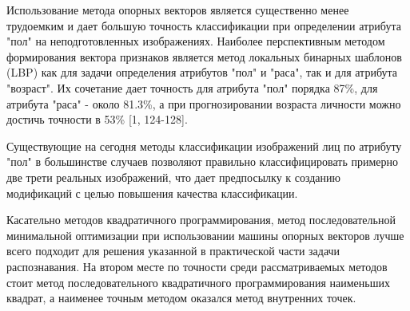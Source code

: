 \documentclass[main.tex]{subfiles}
\begin{document}
Использование метода опорных векторов является существенно менее трудоемким и дает большую точность классификации при определении атрибута "пол" на неподготовленных изображениях. Наиболее перспективным методом формирования вектора признаков является метод локальных бинарных шаблонов (LBP) как для задачи определения атрибутов "пол" и "раса", так и для атрибута "возраст". Их сочетание дает точность для атрибута "пол" порядка 87\%, для атрибута "раса" - около 81.3\%, а при прогнозировании возраста личности можно достичь точности в 53\% [1, 124-128].

Существующие на сегодня методы классификации изображений лиц по атрибуту "пол" в большинстве случаев позволяют правильно классифицировать примерно две трети реальных изображений, что дает предпосылку к созданию модификаций с целью повышения качества классификации.

Касательно методов квадратичного программирования, метод последовательной минимальной оптимизации при использовании машины опорных векторов лучше всего подходит для решения указанной в практической части задачи распознавания. На втором месте по точности среди рассматриваемых методов стоит метод последовательного квадратичного программирования наименьших квадрат, а наименее точным методом оказался метод внутренних точек.
\end{document}
